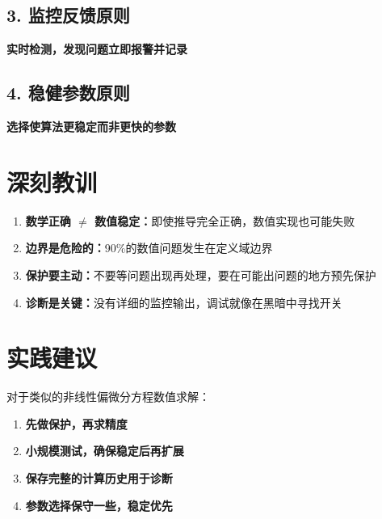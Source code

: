 \documentclass[11pt,a4 paper,one side]{article}
\begin{document}
\subsection*{3. 监控反馈原则}
\begin{center}
\textbf{实时检测，发现问题立即报警并记录}
\end{center}

\subsection*{4. 稳健参数原则}
\begin{center}
\textbf{选择使算法更稳定而非更快的参数}
\end{center}

\section*{深刻教训}

\begin{enumerate}
    \item \textbf{数学正确 $\neq$ 数值稳定：}即使推导完全正确，数值实现也可能失败
    \item \textbf{边界是危险的：}90\%的数值问题发生在定义域边界
    \item \textbf{保护要主动：}不要等问题出现再处理，要在可能出问题的地方预先保护
    \item \textbf{诊断是关键：}没有详细的监控输出，调试就像在黑暗中寻找开关
\end{enumerate}

\section*{实践建议}

对于类似的非线性偏微分方程数值求解：

\begin{enumerate}
    \item \textbf{先做保护，再求精度}
    \item \textbf{小规模测试，确保稳定后再扩展}  
    \item \textbf{保存完整的计算历史用于诊断}
    \item \textbf{参数选择保守一些，稳定优先}
\end{enumerate}

\begin{center}
\end{center}
\end{document}
